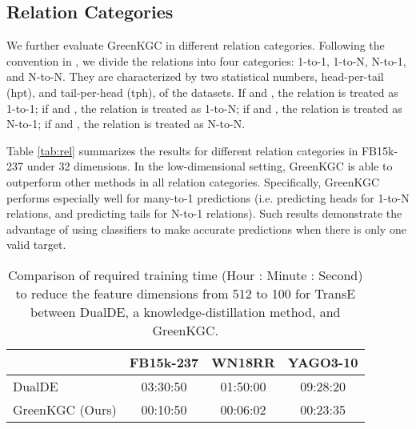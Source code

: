 \documentclass{article}
\begin{document}
{\color{black}
\subsection{Relation Categories}
We further evaluate GreenKGC in different relation categories. Following the 
convention in \citet{wang2014knowledge}, we divide the relations into four
categories: 1-to-1, 1-to-N, N-to-1, and N-to-N. They are characterized by two
statistical numbers, head-per-tail (hpt), and tail-per-head (tph), of the datasets.
If  and , the relation is treated as 1-to-1;
if  and , the relation is treated as 1-to-N;
if  and , the relation is treated as N-to-1;
if  and , the relation is treated as N-to-N.

Table \ref{tab:rel} summarizes the results for different relation categories in
FB15k-237 under 32 dimensions. In the low-dimensional setting, GreenKGC is able to outperform
other methods in all relation categories. Specifically, GreenKGC performs especially 
well for many-to-1 predictions (i.e. predicting heads for 1-to-N relations, and predicting
tails for N-to-1 relations). Such results demonstrate the advantage of using classifiers 
to make accurate predictions when there is only one valid target.
}

\begin{table}[t]
\setlength\tabcolsep{3pt}
\centering
\begin{tabular}{l | c | c | c}
\hline
& \textbf{FB15k-237} & \textbf{WN18RR} & \textbf{YAGO3-10} \\
\hline
DualDE   & 03:30:50 & 01:50:00 & 09:28:20 \\
GreenKGC (Ours) & 00:10:50 & 00:06:02 & 00:23:35 \\
\hline
\end{tabular}
\caption{Comparison of required training time (Hour : Minute : Second) to 
reduce the feature dimensions from 512 to 100 for TransE 
between DualDE, a knowledge-distillation method, and GreenKGC.}
\label{tab:reduction_time}
\end{table}
\end{document}
